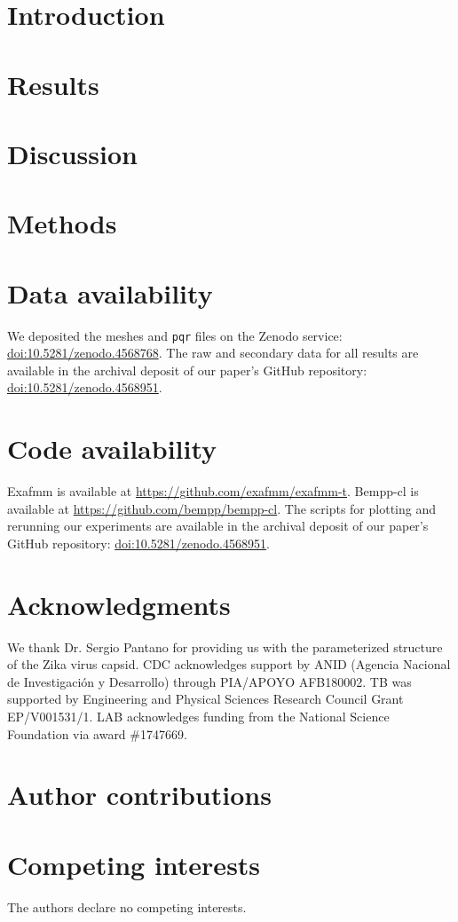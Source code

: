 \documentclass[twocolumn]{article}
\begin{document}
\section{Introduction}\label{sec:intro}


\section{Results}\label{sec:results}


\section{Discussion} \label{sec:discussion}


\small{
\section{Methods}\label{sec:methods}



}

\section{Data availability}
We deposited the meshes and \texttt{pqr} files on the Zenodo service: \href{http://doi.org/10.5281/zenodo.4568768}{doi:10.5281/zenodo.4568768}.
The raw and secondary data for all results are available in the archival deposit of our paper’s GitHub repository: \href{http://doi.org/10.5281/zenodo.4568951}{doi:10.5281/zenodo.4568951}.

\section{Code availability}
Exafmm is available at \href{https://github.com/exafmm/exafmm-t}{https://github.com/exafmm/exafmm-t}.
Bempp-cl is available at \href{https://github.com/bempp/bempp-cl}{https://github.com/bempp/bempp-cl}.
The scripts for plotting and rerunning our experiments are available in the archival deposit of our paper’s GitHub repository: \href{http://doi.org/10.5281/zenodo.4568951}{doi:10.5281/zenodo.4568951}.

{}


\section*{Acknowledgments}
We thank Dr. Sergio Pantano for providing us with the parameterized structure of the Zika virus capsid.
CDC acknowledges support by ANID (Agencia Nacional de Investigaci\'{o}n y Desarrollo) through PIA/APOYO AFB180002.
TB was supported by Engineering and Physical Sciences Research Council Grant EP/V001531/1.
LAB acknowledges funding from the National Science Foundation via award \#1747669.

\section*{Author contributions}

\section*{Competing interests}
The authors declare no competing interests.
\end{document}
